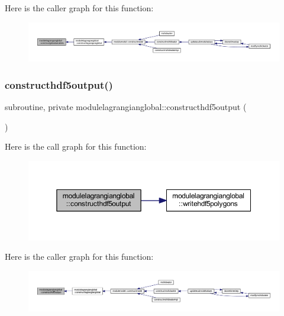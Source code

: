 Here is the caller graph for this function\+:\nopagebreak
\begin{figure}[H]
\begin{center}
\leavevmode
\includegraphics[width=350pt]{namespacemodulelagrangianglobal_ac07ce699fa5190e37b220b344450ba80_icgraph}
\end{center}
\end{figure}
\mbox{\label{namespacemodulelagrangianglobal_a72385af4d9a1a57607853866a0eb0fe0}} 
\subsubsection{\texorpdfstring{constructhdf5output()}{constructhdf5output()}}
{\footnotesize\ttfamily subroutine, private modulelagrangianglobal\+::constructhdf5output (\begin{DoxyParamCaption}{ }\end{DoxyParamCaption})\hspace{0.3cm}{\ttfamily [private]}}

Here is the call graph for this function\+:\nopagebreak
\begin{figure}[H]
\begin{center}
\leavevmode
\includegraphics[width=350pt]{namespacemodulelagrangianglobal_a72385af4d9a1a57607853866a0eb0fe0_cgraph}
\end{center}
\end{figure}
Here is the caller graph for this function\+:\nopagebreak
\begin{figure}[H]
\begin{center}
\leavevmode
\includegraphics[width=350pt]{namespacemodulelagrangianglobal_a72385af4d9a1a57607853866a0eb0fe0_icgraph}
\end{center}
\end{figure}
\mbox{\label{namespacemodulelagrangianglobal_a56d6b284b701a9103a92e0956ad4cc6a}} 
